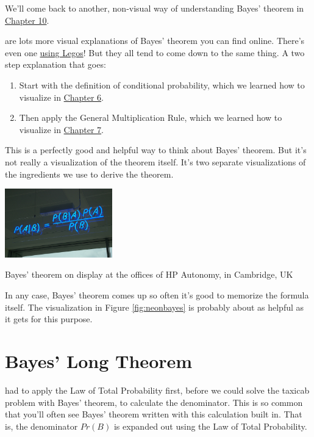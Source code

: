 \documentclass[justified]{tufte-book}
\providecommand{\tightlist}{%
  \setlength{\itemsep}{0pt}\setlength{\parskip}{0pt}}
\newcommand{\p}{Pr}
\theoremstyle{definition}
\theoremstyle{definition}
\theoremstyle{definition}
\theoremstyle{remark}
\begin{document}
We'll come back to another, non-visual way of understanding Bayes' theorem in \protect\hyperlink{bayesibe}{Chapter 10}.

 are lots more visual explanations of Bayes' theorem you can find online. There's even one \href{https://www.countbayesie.com/blog/2015/2/18/bayes-theorem-with-lego}{using Legos}! But they all tend to come down to the same thing. A two step explanation that goes:

\begin{enumerate}
\def\labelenumi{\arabic{enumi}.}
\tightlist
\item
  Start with the definition of conditional probability, which we learned how to visualize in \protect\hyperlink{calculating-conditional-probability}{Chapter 6}.
\item
  Then apply the General Multiplication Rule, which we learned how to visualize in \protect\hyperlink{the-general-multiplication-rule}{Chapter 7}.
\end{enumerate}

This is a perfectly good and helpful way to think about Bayes' theorem. But it's not really a visualization of the theorem itself. It's two separate visualizations of the ingredients we use to derive the theorem.

\begin{marginfigure}
\includegraphics[width=1.83in]{img/neon_bayes} \caption[Bayes' theorem on display at the offices of HP Autonomy, in Cambridge, UK]{Bayes' theorem on display at the offices of HP Autonomy, in Cambridge, UK}\label{fig:neonbayes}
\end{marginfigure}

In any case, Bayes' theorem comes up so often it's good to memorize the formula itself. The visualization in Figure \ref{fig:neonbayes} is probably about as helpful as it gets for this purpose.

\hypertarget{bayes-long-theorem}{%
\section{Bayes' Long Theorem}\label{bayes-long-theorem}}

 had to apply the Law of Total Probability first, before we could solve the taxicab problem with Bayes' theorem, to calculate the denominator. This is so common that you'll often see Bayes' theorem written with this calculation built in. That is, the denominator \(\p(B)\) is expanded out using the Law of Total Probability.
\end{document}
